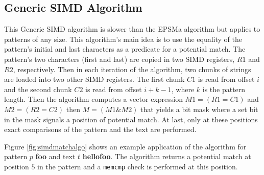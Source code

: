 \subsection{Generic SIMD Algorithm}
This Generic SIMD algorithm \cite{simdalgo} is slower than the EPSMa algorithm but applies to patterns of any size. This algorithm's main idea is to use the equality of the pattern's initial and last characters as a predicate for a potential match. The pattern's two characters (first and last) are copied in two SIMD registers, $R1$ and $R2$, respectively. Then in each iteration of the algorithm, two chunks of strings are loaded into two other SIMD registers. The first chunk $C1$ is read from offset $i$ and the second chunk $C2$ is read from offset $i + k - 1$, where $k$ is the pattern length. Then the algorithm computes a vector expression $M1 = (R1 = C1)$ and $M2 = (R2 = C2)$ then $M = (M1 \& M2)$ that yields a bit mask where a set bit in the mask signals a position of potential match. At last, only at these positions exact comparisons of the pattern and the text are performed.

Figure \ref{fig:simdmatchalgo} shows an example application of the algorithm for pattern $p$ \textbf{foo} and text $t$ \textbf{hellofoo}. The algorithm returns a potential match at position $5$ in the pattern and a \texttt{memcmp} check is performed at this position.

